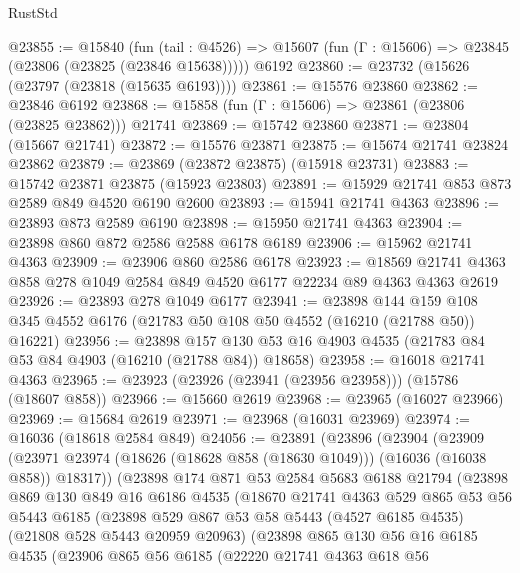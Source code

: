 \begin{lexlean}{RustStd}
\begin{coremodule}
@23855 := @15840
    (fun (tail : @4526) => @15607 (fun (Γ : @15606) => @23845 (@23806 (@23825 (@23846 @15638)))))
    @6192
@23860 := @23732 (@15626 (@23797 (@23818 (@15635 @6193))))
@23861 := @15576 @23860
@23862 := @23846 @6192
@23868 := @15858 (fun (Γ : @15606) => @23861 (@23806 (@23825 @23862))) @21741
@23869 := @15742 @23860
@23871 := @23804 (@15667 @21741)
@23872 := @15576 @23871
@23875 := @15674 @21741 @23824 @23862
@23879 := @23869 (@23872 @23875) (@15918 @23731)
@23883 := @15742 @23871 @23875 (@15923 @23803)
@23891 := @15929 @21741 @853 @873 @2589 @849 @4520 @6190 @2600
@23893 := @15941 @21741 @4363
@23896 := @23893 @873 @2589 @6190
@23898 := @15950 @21741 @4363
@23904 := @23898 @860 @872 @2586 @2588 @6178 @6189
@23906 := @15962 @21741 @4363
@23909 := @23906 @860 @2586 @6178
@23923 := @18569 @21741 @4363 @858 @278 @1049 @2584 @849 @4520 @6177 @22234 @89 @4363 @4363 @2619
@23926 := @23893 @278 @1049 @6177
@23941 := @23898
    @144
    @159
    @108
    @345
    @4552
    @6176
    (@21783 @50 @108 @50 @4552 (@16210 (@21788 @50)) @16221)
@23956 := @23898
    @157
    @130
    @53
    @16
    @4903
    @4535
    (@21783 @84 @53 @84 @4903 (@16210 (@21788 @84)) @18658)
@23958 := @16018 @21741 @4363
@23965 := @23923 (@23926 (@23941 (@23956 @23958))) (@15786 (@18607 @858))
@23966 := @15660 @2619
@23968 := @23965 (@16027 @23966)
@23969 := @15684 @2619
@23971 := @23968 (@16031 @23969)
@23974 := @16036 (@18618 @2584 @849)
@24056 := @23891
    (@23896
      (@23904
        (@23909 (@23971 @23974 (@18626 (@18628 @858 (@18630 @1049))) (@16036 (@16038 @858)) @18317))
        (@23898
          @174
          @871
          @53
          @2584
          @5683
          @6188
          @21794
          (@23898
            @869
            @130
            @849
            @16
            @6186
            @4535
            (@18670
              @21741
              @4363
              @529
              @865
              @53
              @56
              @5443
              @6185
              (@23898
                @529
                @867
                @53
                @58
                @5443
                (@4527 @6185 @4535)
                (@21808 @528 @5443 @20959 @20963)
                (@23898
                  @865
                  @130
                  @56
                  @16
                  @6185
                  @4535
                  (@23906
                    @865
                    @56
                    @6185
                    (@22220
                      @21741
                      @4363
                      @618
                      @56

\end{coremodule}
\end{lexlean}
